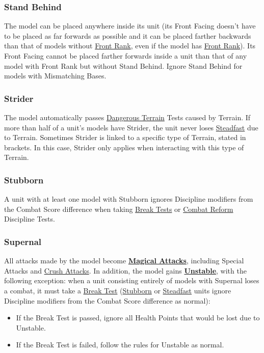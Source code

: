 \subsubsection{Stand Behind}
\idx[main=y]{\standbehind}\label{stand_behind}

The model can be placed anywhere inside its unit (its Front Facing doesn't have to be placed as far forwards as possible and it can be placed farther backwards than that of models without \hyperref[front_rank]{Front Rank}, even if the model has \hyperref[front_rank]{Front Rank}). Its Front Facing cannot be placed farther forwards inside a unit than that of any model with Front Rank but without Stand Behind. Ignore Stand Behind for models with Mismatching Bases.

\subsubsection{Strider}
\idx[main=y]{\strider{}}\label{strider}

The model automatically passes \hyperref[dangerous_terrain]{Dangerous Terrain} Tests caused by Terrain. If more than half of a unit's models have Strider, the unit never loses \hyperref[steadfast]{Steadfast} due to Terrain. Sometimes Strider is linked to a specific type of Terrain, stated in brackets. In this case, Strider only applies when interacting with this type of Terrain.

\subsubsection{Stubborn}
\idx[main=y]{\stubborn}\label{stubborn}

A unit with at least one model with Stubborn ignores Discipline modifiers from the Combat Score difference when taking \hyperref[break_test]{Break Tests} or \hyperref[combat_reform]{Combat Reform} Discipline Tests.

\subsubsection{Supernal}
\idx[main=y]{\supernal}\label{supernal}

All attacks made by the model become \hyperref[magical_attacks]{\textbf{Magical Attacks}}, including Special Attacks and \hyperref[crush_attack]{Crush Attacks}. In addition, the model gains \hyperref[unstable]{\textbf{Unstable}}, with the following exception: when a unit consisting entirely of models with Supernal loses a combat, it must take a \hyperref[break_test]{Break Test} (\hyperref[stubborn]{Stubborn} or \hyperref[steadfast]{Steadfast} units ignore Discipline modifiers from the Combat Score difference as normal):
\begin{itemize}
	\item If the Break Test is passed, ignore all Health Points that would be lost due to Unstable.
	\item If the Break Test is failed, follow the rules for Unstable as normal.
\end{itemize}

